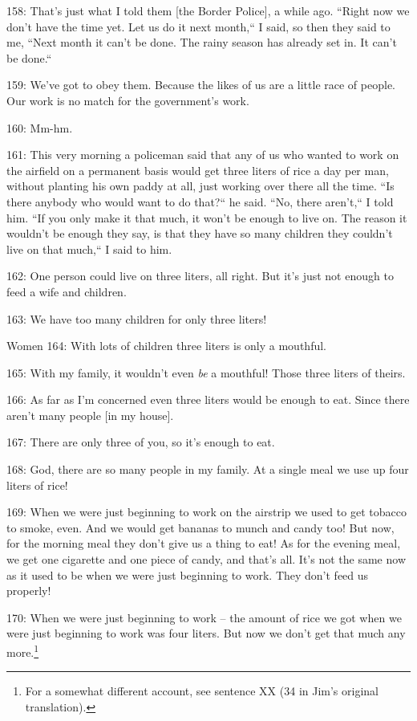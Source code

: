 158: That's just what I told them [the Border Police], a while ago. ``Right
now we don't have the time yet. Let us do it next month,`` I said, so then
they said to me, ``Next month it can't be done. The rainy season has already set
in. It can't be done.``

159: We've got to obey them. Because the likes of us are a little race of people.
Our work is no match for the government's work.

160: Mm-hm.

161: This very morning a policeman said that any of us who wanted to work on the
airfield on a permanent basis would get three liters of rice a day per man, without
planting his own paddy at all, just working over there all the time. ``Is
there anybody who would want to do that?`` he said. ``No, there
aren't,`` I told him. ``If you only make it that much, it won't
be enough to live on. The reason it wouldn't be enough they say, is that they have
so many children they couldn't live on that much,`` I said to him.

162: One person could live on three liters, all right. But it's just not enough
to feed a wife and children.

163: We have too many children for only three liters!

Women 164: With lots of children three liters is only a mouthful.

165: With my family, it wouldn't even \textit{be} a mouthful! Those three liters
of theirs.

166: As far as I'm concerned even three liters would be enough to eat. Since there
aren't many people [in my house].

167: There are only three of you, so it's enough to eat.

168: God, there are so many people in my family. At a single meal we use up four
liters of rice!

169: When we were just beginning to work on the airstrip we used to get tobacco
to smoke, even. And we would get bananas to munch and candy too! But now, for the
morning meal they don't give us a thing to eat! As for the evening meal, we get
one cigarette and one piece of candy, and that's all. It's not the same now as
it used to be when we were just beginning to work. They don't feed us properly!

170: When we were just beginning to work -- the amount of rice we got when we were
just beginning to work was four liters. But now we don't get that much any more.\footnote{For a somewhat different account, see sentence XX (34 in Jim's original translation).}

